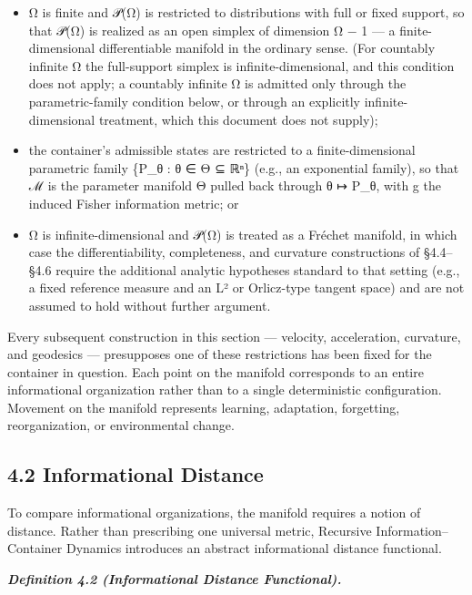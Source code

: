 \documentclass[
]{article}
\begin{document}
\begin{itemize}
\item
  Ω is finite and 𝒫(Ω) is restricted to distributions with full or fixed
  support, so that 𝒫(Ω) is realized as an open simplex of dimension Ω −
  1 --- a finite-dimensional differentiable manifold in the ordinary
  sense. (For countably infinite Ω the full-support simplex is
  infinite-dimensional, and this condition does not apply; a countably
  infinite Ω is admitted only through the parametric-family condition
  below, or through an explicitly infinite-dimensional treatment, which
  this document does not supply);
\item
  the container's admissible states are restricted to a
  finite-dimensional parametric family \{P\_θ : θ ∈ Θ ⊆ ℝⁿ\} (e.g., an
  exponential family), so that ℳ is the parameter manifold Θ pulled back
  through θ ↦ P\_θ, with g the induced Fisher information metric; or
\item
  Ω is infinite-dimensional and 𝒫(Ω) is treated as a Fréchet manifold,
  in which case the differentiability, completeness, and curvature
  constructions of §4.4--§4.6 require the additional analytic hypotheses
  standard to that setting (e.g., a fixed reference measure and an L² or
  Orlicz-type tangent space) and are not assumed to hold without further
  argument.
\end{itemize}

Every subsequent construction in this section --- velocity,
acceleration, curvature, and geodesics --- presupposes one of these
restrictions has been fixed for the container in question. Each point on
the manifold corresponds to an entire informational organization rather
than to a single deterministic configuration. Movement on the manifold
represents learning, adaptation, forgetting, reorganization, or
environmental change.

\hypertarget{informational-distance}{%
\subsection{4.2 Informational Distance}\label{informational-distance}}

To compare informational organizations, the manifold requires a notion
of distance. Rather than prescribing one universal metric, Recursive
Information--Container Dynamics introduces an abstract informational
distance functional.

\emph{\textbf{Definition 4.2 (Informational Distance Functional).}}
\end{document}
